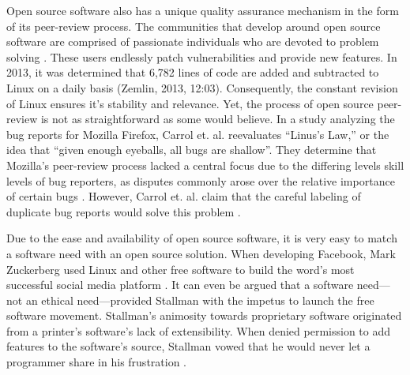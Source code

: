 Open source software also has a unique quality assurance mechanism in the form of its peer-review process. The communities that develop around open source software are comprised of passionate individuals who are devoted to problem solving \citep[p. 19]{bisson}. These users endlessly patch vulnerabilities and provide new features. In 2013, it was determined that 6,782 lines of code are added and subtracted to Linux on a daily basis (Zemlin, 2013, 12:03). Consequently, the  constant revision of Linux ensures it's stability and relevance. Yet, the process of open source peer-review is not as straightforward as some would believe. In a study analyzing the bug reports for Mozilla Firefox, Carrol et. al. reevaluates “Linus's Law,” or the idea that “given enough eyeballs, all bugs are shallow”\citep[p. 52]{wang}.  They determine that Mozilla's peer-review process lacked a central focus due to the differing levels skill levels of bug reporters, as disputes commonly arose over the relative importance of certain bugs \citeyear[p. 52]{wang}. However, Carrol et. al.  claim that the careful labeling of duplicate bug reports would solve this problem \citeyear[p. 52]{wang}. 

Due to the ease and availability of open source software, it is very easy to match a software need with an open source solution. When developing Facebook, Mark Zuckerberg used Linux and other free software to build the word's most successful social media platform \citep[6:18]{zemlin}. It can even be argued that a software need—not an ethical need—provided Stallman with the impetus to launch the free software movement. Stallman's animosity towards proprietary software originated from a printer's software's lack of extensibility. When denied permission to add features to the software's source, Stallman vowed that he would never let a programmer share in his frustration \citeyear[para. 19]{rms2015}.  
	
	
	
	
